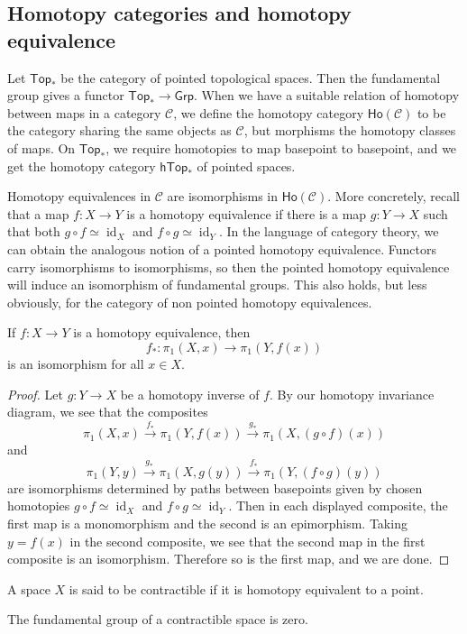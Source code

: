 \subsection{Homotopy categories and homotopy equivalence}
Let $\mathsf{Top}_*$ be the category of pointed topological spaces. Then the fundamental group gives a functor $\mathsf{Top} _* \to \mathsf{Grp} $. When we have a suitable relation of homotopy between maps in a category $\mathcal{C} $, we define the homotopy category $\mathsf{Ho} (\mathcal{C} )$ to be the category sharing the same objects as $\mathcal{C} $, but morphisms the homotopy classes of maps. On $\mathsf{Top} _*$, we require homotopies to map basepoint to basepoint, and we get the homotopy category $\mathsf{hTop}_* $ of pointed spaces.

Homotopy equivalences in $\mathcal{C} $ are isomorphisms in $\mathsf{Ho} (\mathcal{C} )$. More concretely, recall that a map $f \colon X \to Y$ is a homotopy equivalence if there is a map $g \colon Y \to X$ such that both $g\circ f \simeq \operatorname{id}_X$ and $f\circ g \simeq \operatorname{id}_Y$. In the language of category theory, we can obtain the analogous notion of a pointed homotopy equivalence. Functors carry isomorphisms to isomorphisms, so then the pointed homotopy equivalence will induce an isomorphism of fundamental groups. This also holds, but less obviously, for the category of non pointed homotopy equivalences.
\begin{theorem}
    If $f \colon X \to Y$ is a homotopy equivalence, then \[
        f_* \colon \pi_1(X,x) \to \pi_1(Y,f(x))
    \] is an isomorphism for all $x\in X$.
\end{theorem}
\begin{proof}
    Let $g \colon Y \to X$ be a homotopy inverse of $f$. By our homotopy invariance diagram, we see that the composites \[
        \pi_1(X,x)\overset{f_*}{\longrightarrow }\pi_1(Y,f(x))\overset{g_*}{\longrightarrow}\pi_1(X,(g\circ f)(x))
    \] and \[
    \pi_1(Y,y)\overset{g_*}{\longrightarrow}\pi_1(X,g(y))\overset{f_*}{\longrightarrow}\pi_1(Y,(f\circ g)(y))
\] are isomorphisms determined by paths between basepoints given by chosen homotopies $g\circ f \simeq \operatorname{id}_X$ and $f\circ g \simeq \operatorname{id}_Y$. Then in each displayed composite, the first map is a monomorphism and the second is an epimorphism. Taking $y=f(x)$ in the second composite, we see that the second map in the first composite is an isomorphism. Therefore so is the first map, and we are done.
\end{proof}
A space $X$ is said to be contractible if it is homotopy equivalent to a point.
\begin{cor}
    The fundamental group of a contractible space is zero.
\end{cor}

